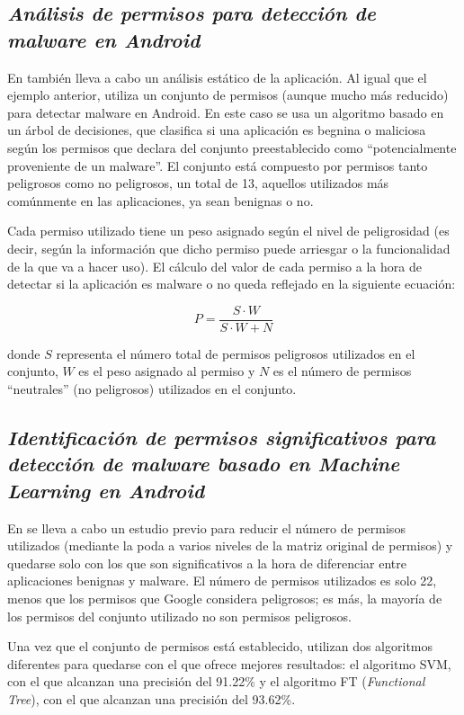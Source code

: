 \subsection{\textit{Análisis de permisos para detección de malware en Android}}

En\hypersetup{citecolor=red}\cite{giang} también lleva a cabo un análisis estático de la aplicación. Al igual que el ejemplo anterior, utiliza un conjunto de permisos (aunque mucho más reducido) para detectar malware en Android. En este caso se usa un algoritmo basado en un árbol de decisiones, que clasifica si una aplicación es begnina o maliciosa según los permisos que declara del conjunto preestablecido como ``potencialmente proveniente de un malware''. El conjunto está compuesto por permisos tanto peligrosos como no peligrosos, un total de 13, aquellos utilizados más comúnmente en las aplicaciones, ya sean benignas o no.

Cada permiso utilizado tiene un peso asignado según el nivel de peligrosidad (es decir, según la información que dicho permiso puede arriesgar o la funcionalidad de la que va a hacer uso). El cálculo del valor de cada permiso a la hora de detectar si la aplicación es malware o no queda reflejado en la siguiente ecuación:

\[
P = \frac{S\cdot W}{S\cdot W+N}
\]

donde $S$ representa el número total de permisos peligrosos utilizados en el conjunto, $W$ es el peso asignado al permiso y $N$ es el número de permisos ``neutrales'' (no peligrosos) utilizados en el conjunto.

\subsection{\textit{Identificación de permisos significativos para detección de malware basado en Machine Learning en Android}}

En \hypersetup{citecolor=red}\cite{sigpid} se lleva a cabo un estudio previo para reducir el número de permisos utilizados (mediante la poda a varios niveles de la matriz original de permisos) y quedarse solo con los que son significativos a la hora de diferenciar entre aplicaciones benignas y malware. El número de permisos utilizados es solo 22, menos que los permisos que Google considera peligrosos; es más, la mayoría de los permisos del conjunto utilizado no son permisos peligrosos.

Una vez que el conjunto de permisos está establecido, utilizan dos algoritmos diferentes para quedarse con el que ofrece mejores resultados: el algoritmo SVM, con el que alcanzan una precisión del 91.22\% y el algoritmo FT (\textit{Functional Tree}), con el que alcanzan una precisión del 93.62\%.

